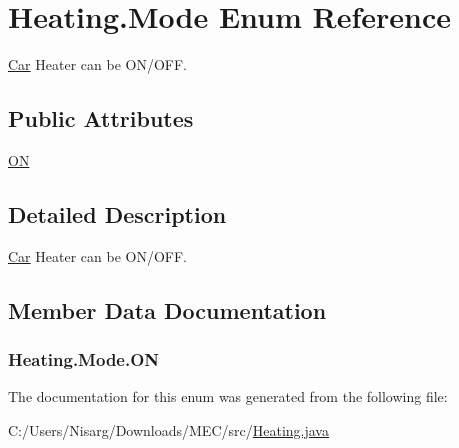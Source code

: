 \hypertarget{enum_heating_1_1_mode}{}\section{Heating.\+Mode Enum Reference}
\label{enum_heating_1_1_mode}


\hyperlink{class_car}{Car} Heater can be O\+N/\+O\+F\+F.  


\subsection*{Public Attributes}
\begin{DoxyCompactItemize}
\item 
\hyperlink{enum_heating_1_1_mode_ae86061d98762c20803e49ff578844f29}{O\+N}
\end{DoxyCompactItemize}


\subsection{Detailed Description}
\hyperlink{class_car}{Car} Heater can be O\+N/\+O\+F\+F. 

\subsection{Member Data Documentation}
\hypertarget{enum_heating_1_1_mode_ae86061d98762c20803e49ff578844f29}{}
\subsubsection[{O\+N}]{\setlength{\rightskip}{0pt plus 5cm}Heating.\+Mode.\+O\+N}\label{enum_heating_1_1_mode_ae86061d98762c20803e49ff578844f29}


The documentation for this enum was generated from the following file\+:\begin{DoxyCompactItemize}
\item 
C\+:/\+Users/\+Nisarg/\+Downloads/\+M\+E\+C/src/\hyperlink{_heating_8java}{Heating.\+java}\end{DoxyCompactItemize}
